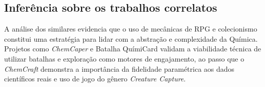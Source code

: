 \subsection{Inferência sobre os trabalhos correlatos}

A análise dos similares evidencia que o uso de mecânicas de RPG e colecionismo constitui uma estratégia para lidar com a abstração e complexidade da Química. Projetos como \textit{ChemCaper} e Batalha QuímiCard \cite{GomesdeFreitas2017} validam a viabilidade técnica de utilizar batalhas e exploração como motores de engajamento, ao passo que o \textit{ChemCraft} \cite{Han2021} demonstra a importância da fidelidade paramétrica aos dados científicos reais e uso de jogo do gênero \textit{Creature Capture}.
